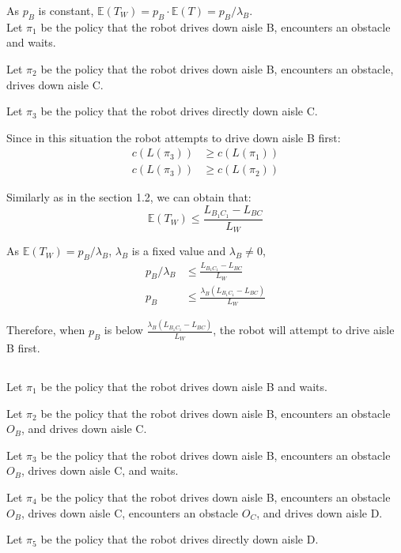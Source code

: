 \documentclass{article}
\begin{document}
As $p_{B}$ is constant, $\mathbb{E}(T_{W}) = p_{B} \cdot \mathbb{E}(T) =  p_{B} / \lambda_{B}$. \\


Let $\pi_{1}$ be the policy that the robot drives down aisle B, encounters an obstacle and waits.

Let $\pi_{2}$ be the policy that the robot drives down aisle B, encounters an obstacle, drives down aisle C.

Let $\pi_{3}$ be the policy that the robot drives directly down aisle C.

Since in this situation the robot attempts to drive down aisle B first:
\begin{align}
c(L(\pi_{3})) &\geq c(L(\pi_{1})) \\
c(L(\pi_{3})) &\geq c(L(\pi_{2}))
\end{align}

Similarly as in the section 1.2, we can obtain that: 
\[
\mathbb{E} (T_{W}) \leq \frac{L_{B_{1}C_{1}} - L_{BC}} {L_{W}}
\]

As $\mathbb{E}(T_{W}) = p_{B} / \lambda_{B}$, $\lambda_{B}$ is a fixed value and $ \lambda_{B} \ne 0$,
\begin{align*}
p_{B} / \lambda_{B} &\leq \frac{L_{B_{1}C_{1}} - L_{BC}} {L_{W}} \\
p_{B}  &\leq \frac{\lambda_{B}(L_{B_{1}C_{1}} - L_{BC})} {L_{W}}
\end{align*}

Therefore, when $p_{B}$ is below $\frac{\lambda_{B}(L_{B_{1}C_{1}} - L_{BC})} {L_{W}}$, the robot will attempt to drive aisle B first.

\subsection{}

Let $\pi_{1}$ be the policy that the robot drives down aisle B and waits.

Let $\pi_{2}$ be the policy that the robot drives down aisle B, encounters an obstacle $O_{B}$, and drives down aisle C.

Let $\pi_{3}$ be the policy that the robot drives down aisle B, encounters an obstacle $O_{B}$, drives down aisle C, and waits.

Let $\pi_{4}$ be the policy that the robot drives down aisle B, encounters an obstacle $O_{B}$, drives down aisle C, encounters an obstacle $O_{C}$, and drives down aisle D.

Let $\pi_{5}$ be the policy that the robot drives directly down aisle D.
\end{document}
